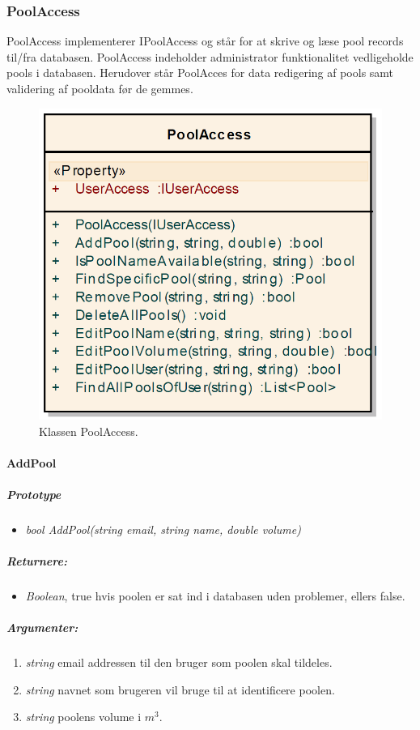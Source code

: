 \subsubsection{PoolAccess}
PoolAccess implementerer IPoolAccess og står for at skrive og læse pool records til/fra databasen. PoolAccess indeholder administrator funktionalitet vedligeholde pools i databasen. Herudover står PoolAcces for data redigering af pools samt validering af pooldata før de gemmes.

\begin{figure}
\centering
\includegraphics[width=0.46\linewidth]{figs/implementering/poolAccessClass.PNG}
\caption{Klassen PoolAccess.}
\label{fig:poolAccessClass}
\end{figure}

\paragraph{AddPool}%

\subparagraph{Prototype}
\begin{itemize}
	\item \textit{bool AddPool(string email, string name, double volume)}
\end{itemize}

\subparagraph{Returnere:}
\begin{itemize}
	\item \textit{Boolean}, true hvis poolen er sat ind i databasen uden problemer, ellers false.
\end{itemize}

\subparagraph{Argumenter:}
\begin{enumerate}
	\item \textit{string} email addressen til den bruger som poolen skal tildeles.
	\item \textit{string} navnet som brugeren vil bruge til at identificere poolen.
	\item \textit{string} poolens volume i $m^3$.
\end{enumerate}

